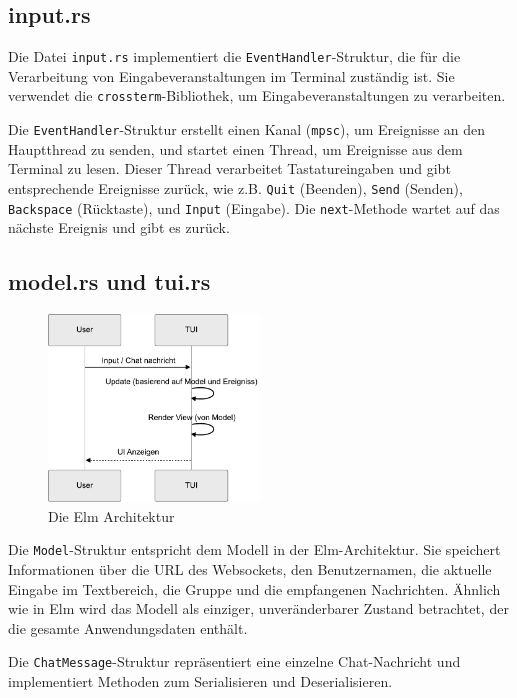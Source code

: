 \documentclass[a4paper]{article}
\begin{document}
\subsection{input.rs}

Die Datei \texttt{input.rs} implementiert die \texttt{EventHandler}-Struktur, die für die Verarbeitung von Eingabeveranstaltungen im Terminal zuständig ist. Sie verwendet die \texttt{crossterm}-Bibliothek, um Eingabeveranstaltungen zu verarbeiten.

Die \texttt{EventHandler}-Struktur erstellt einen Kanal (\texttt{mpsc}), um Ereignisse an den Hauptthread zu senden, und startet einen Thread, um Ereignisse aus dem Terminal zu lesen. Dieser Thread verarbeitet Tastatureingaben und gibt entsprechende Ereignisse zurück, wie z.B. \texttt{Quit} (Beenden), \texttt{Send} (Senden), \texttt{Backspace} (Rücktaste), und \texttt{Input} (Eingabe). Die \texttt{next}-Methode wartet auf das nächste Ereignis und gibt es zurück.


\subsection{model.rs und tui.rs}

\begin{figure}[hbt]
    \centering
    \includegraphics[width=0.5\textwidth]{ELM.pdf}
    \caption{Die Elm Architektur}\label{fig:elm}
\end{figure}

Die \texttt{Model}-Struktur entspricht dem Modell in der Elm-Architektur. Sie speichert Informationen über die URL des Websockets, den Benutzernamen, die aktuelle Eingabe im Textbereich, die Gruppe und die empfangenen Nachrichten. Ähnlich wie in Elm wird das Modell als einziger, unveränderbarer Zustand betrachtet, der die gesamte Anwendungsdaten enthält.

Die \texttt{ChatMessage}-Struktur repräsentiert eine einzelne Chat-Nachricht und implementiert Methoden zum Serialisieren und Deserialisieren.
\end{document}

